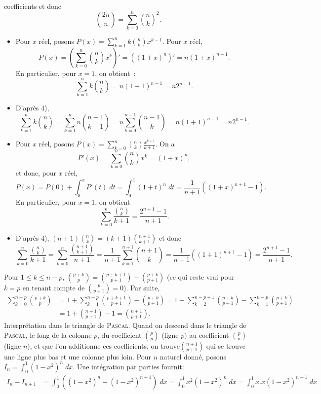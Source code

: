 {\begin{enumerate}
{coefficients et donc
$$\binom{2n}{n}=\sum_{k=0}^{n}\binom{n}{k}^2.$$
\begin{itemize}
\item[\textbf{1ère solution.}] Pour $x$ réel, posons $P(x)=\sum_{k=1}^{n}k\binom{n}{k}x^{k-1}$.
Pour $x$ réel, $$P(x)=(\sum_{k=0}^{n}\binom{n}{k}x^{k})'=((1+x)^n)'=n(1+x)^{n-1}.$$
En particulier, pour $x=1$, on obtient~:
$$\sum_{k=1}^{n}k\binom{n}{k}=n(1+1)^{n-1}=n2^{n-1}.$$
\item[\textbf{2ème solution.}] D'après 4),
$$\sum_{k=1}^{n}k\binom{n}{k}=\sum_{k=1}^{n}n\binom{n-1}{k-1}=n\sum_{k=0}^{n-1}\binom{n-1}{k}=n(1+1)^{n-1}=n2^{n-1}.$$
\end{itemize}
\begin{itemize}
\item[\textbf{1ère solution.}] Pour $x$ réel, posons $P(x)=\sum_{k=0}^{n}\binom{n}{k}\frac{x^{k+1}}{k+1}$. On a
$$P'(x)=\sum_{k=0}^{n}\binom{n}{k}x^k=(1+x)^n,$$
et donc, pour $x$ réel,
$$P(x)=P(0)+\int_{0}^{x}P'(t)\;dt=\int_{0}^{1}(1+t)^n\;dt=\frac{1}{n+1}((1+x)^{n+1}-1).$$
En particulier, pour $x=1$, on obtient
$$\sum_{k=0}^{n}\frac{\binom{n}{k}}{k+1}=\frac{2^{n+1}-1}{n+1}.$$
\item[\textbf{2ème solution.}] D'après 4), $(n+1)\binom{n}{k}=(k+1)\binom{n+1}{k+1}$ et donc
$$\sum_{k=0}^{n}\frac{\binom{n}{k}}{k+1}=\sum_{k=0}^{n}\frac{\binom{n+1}{k+1}}{n+1}=\frac{1}{n+1}\sum_{k=1}^{n+1}\binom{n+1}{k}
=\frac{1}{n+1}((1+1)^{n+1}-1)=\frac{2^{n+1}-1}{n+1}.$$
\end{itemize}
Pour $1\leq k\leq n-p$, $\binom{p+k}{p}=\binom{p+k+1}{p+1}-\binom{p+k}{p+1}$ (ce qui reste vrai pour $k=p$ en tenant
compte de $\binom{p}{p+1}=0$). Par suite,
\begin{align*}
\sum_{k=0}^{n-p}\binom{p+k}{p}&=1+\sum_{k=1}^{n-p}\binom{p+k+1}{p+1}-\binom{p+k}{p+1}=1+\sum_{k=2}^{n-p+1}\binom{p+k}{p+1}
-\sum_{k=1}^{n-p}\binom{p+k}{p+1}\\
 &=1+\binom{n+1}{p+1}-1=\binom{n+1}{p+1}.
\end{align*}
Interprétation dans le triangle de \textsc{Pascal}. Quand on descend dans le triangle de \textsc{Pascal}, le long de la
colonne $p$, du coefficient $\binom{p}{p}$ (ligne $p$) au coefficient $\binom{p}{n}$ (ligne $n$), et que l'on additionne ces
coefficients, on trouve$\binom{n+1}{p+1}$ qui se trouve une ligne plus bas et une colonne plus loin.
Pour $n$ naturel donné, posons $I_n=\int_{0}^{1}(1-x^2)^n\;dx$. Une intégration par parties fournit:
\begin{align*}
I_n-I_{n+1}&=\int_{0}^{1}((1-x^2)^n-(1-x^2)^{n+1})\;dx=\int_{0}^{1}x^2(1-x^2)^n\;dx=\int_{0}^{1}x.x(1-x^2)^{n+1}\;dx\\

\end{align*}}
\end{enumerate}}
